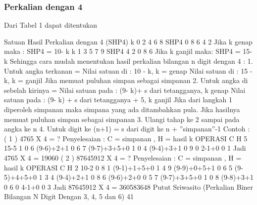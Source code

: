 \subsubsection{Perkalian dengan 4}
Dari Tabel 1 dapat ditentukan

Satuan Hasil Perkalian dengan 4 (SHP4)
k 0 2 4 6 8
SHP4 0 8 6 4 2
Jika k genap maka :
SHP4 = 10- k
k 1 3 5 7 9
SHP4 4 2 0 8 6
Jika k ganjil maka:
SHP4 = 15- k
Sehingga cara mudah menentukan hasil
perkalian bilangan n digit dengan 4 :
1. Untuk angka terkanan =
Nilai satuan di : 10 - k, k = genap
Nilai satuan di : 15 - k, k = ganjil
Jika memuat puluhan simpan sebagai
simpanan
2. Untuk angka di sebelah kirinya =
Nilai satuan pada : (9- k)+ s dari
tetangganya, k genap
Nilai satuan pada : (9- k) + s dari
tetangganya + 5, k ganjil
Jika dari langkah 1 diperoleh
simpanan maka simpana yang ada
ditambahkan pula.
Jika hasilnya memuat puluhan simpan
sebagai simpanan
3. Ulangi tahap ke 2 sampai pada angka ke n
4. Untuk digit ke (n+1) =
 s dari digit ke n + ”simpanan”-1
Contoh :
( 1 ) 4765 X 4 = ?
Penyelesaian :
C = simpanan , H = hasil
k OPERASI C H
5 15-5 1 0
6 (9-6)+2+1 0 6
7 (9-7)+3+5+0 1 0
4 (9-4)+3+1 0 9
0 2-1+0 0 1
Jadi 4765 X 4 = 19060
( 2 ) 87645912 X 4 = ?
Penyelesaian :
C = simpanan , H = hasil
k OPERASI C H
2 10-2 0 8
1 (9-1)+1+5+0 1 4
9 (9-9)+0+5+1 0 6
5 (9-5)+4+5+0 1 3
4 (9-4)+2+1 0 8
6 (9-6)+2+0 0 5
7 (9-7)+3+5+0 1 0
8 (9-8)+3+1 0 6
0 4-1+0 0 3
Jadi 87645912 X 4 = 360583648
Putut Sriwasito (Perkalian Biner Bilangan N Digit Dengan 3, 4, 5 dan 6)
41

